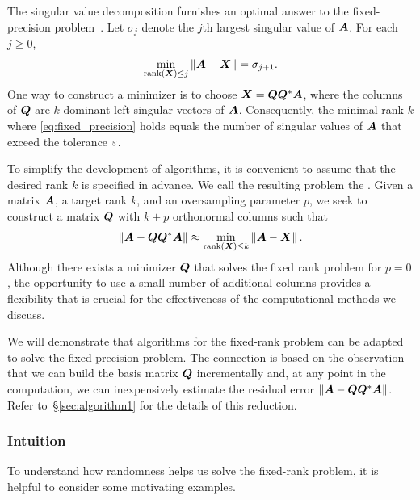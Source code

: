 \documentclass[final]{siamltex}
\newcounter{algorithm}[section]
\begin{document}
The singular value decomposition furnishes an optimal answer to
the fixed-precision problem~\cite{Mir60:Symmetric-Gauge}.
Let $\sigma_{j}$ denote the $j$th largest singular value of $\bm{A}$.
For each $j \geq 0$,
\begin{equation}
\label{eqn:mirsky}
\min_{{\rm rank}(\mtx{X}) \leq j}\norm{ \mtx{A} - \mtx{X} } = \sigma_{j+1}.
\end{equation}
One way to construct a minimizer is to choose $\bm{X} = \bm{QQ}^*\bm{A}$,
where the columns of $\bm{Q}$ are $k$ dominant left singular vectors of $\bm{A}$.
Consequently, the minimal rank $k$ where \eqref{eq:fixed_precision} holds
equals the number of singular values of $\bm{A}$ that exceed the tolerance $\varepsilon$.

To simplify the development of algorithms, it is convenient to assume
that the desired rank $k$ is specified in advance.
We call the resulting problem the .  Given a matrix $\bm{A}$, a target rank $k$,
and an oversampling parameter $p$, we seek to construct a matrix
$\bm{Q}$ with $k + p$ orthonormal columns such that
\begin{equation}
\label{eq:fixed_rank}
\norm{ \mtx{A} - \mtx{Q}\mtx{Q}^{\adj}\mtx{A} } \approx
\min_{{\rm rank}(\mtx{X}) \leq k}\norm{ \mtx{A} - \mtx{X} }.
\end{equation}
Although there exists a minimizer $\bm{Q}$ that solves the fixed rank
problem for $p=0$,  the opportunity to use a small number of
additional columns provides a flexibility that is crucial for the
effectiveness of the computational methods we discuss.

We will demonstrate that algorithms for the fixed-rank
problem can be adapted to solve the fixed-precision problem.
The connection is based on the observation that we can build the
basis matrix $\bm{Q}$ incrementally and, at any point in the
computation, we can inexpensively estimate the residual error
$\left\Vert {\bm{A}-\bm{QQ}^*\bm{A}} \right\Vert$.
Refer to~\S\ref{sec:algorithm1} for the details
of this reduction.

\subsubsection{Intuition}
\label{sec:intuition}

To understand how randomness helps us solve the fixed-rank
problem, it is helpful to consider some motivating examples.
\end{document}
